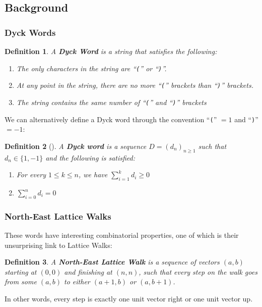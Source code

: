 \newtheorem*{definition}{Definition}
\newtheorem*{theorem}{Theorem}

\subsection{Background}

\subsubsection{Dyck Words}
\begin{definition}
    A \textbf{Dyck Word} is a string that satisfies the following:
    \begin{enumerate}
        \item The only characters in the string are ``\texttt{(}'' or ``\texttt{)}''.
        \item At any point in the string, there are no more ``\texttt{(}'' brackets than ``\texttt{)}'' brackets.
        \item The string contains the same number of ``\texttt{(}'' and ``\texttt{)}'' brackets
    \end{enumerate}
\end{definition}

\noindent We can alternatively define a Dyck word through the convention ``\texttt{(}'' $= 1$ and ``\texttt{)}'' $= -1$:

\begin{definition}[{\cite{chistikov2020re}}]
    A \textbf{Dyck word} is a sequence $D=(d_{n})_{n\geq 1}$ such that ${d_{n}\in\{1, -1\}}$ and the following is satisfied:
    \begin{enumerate}
        \item For every \! $1 \leq k \leq n$, we have \! $\sum_{i = 1}^{k} d_{i} \geq 0$ 
        \item $\sum_{i = 0}^{n} d_{i} = 0$
    \end{enumerate} 
\end{definition}

\subsubsection{North-East Lattice Walks}
\noindent These words have interesting combinatorial properties, one of which is their unsurprising link to Lattice Walks:

\begin{definition}
    A \textbf{North-East Lattice Walk} is a sequence of vectors $(a, b)$ starting at $(0, 0)$ and finishing at $(n, n)$, such that every step on the walk goes from some $(a, b)$ to either $(a+1, b)$ or $(a, b+1)$.
\end{definition}
In other words, every step is exactly one unit vector right or one unit vector up.

